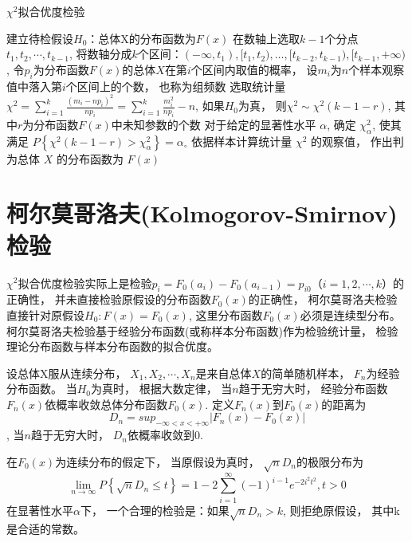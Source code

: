 \begin{algorithm}
\caption{$\chi^2$拟合优度检验}
建立待检假设$H_0$：总体X的分布函数为$F(x)$\;
在数轴上选取$k-1$个分点$t_1,t_2,\cdots,t_{k-1}$, 将数轴分成$k$个区间：$(-\infty,t_1), [t_1,t_2), …, [t_{k-2},t_{k-1}), [t_{k-1},+\infty)$, 令$p_i$为分布函数$F(x)$的总体$X$在第$i$个区间内取值的概率， 设$m_i$为$n$个样本观察值中落入第$i$个区间上的个数， 也称为组频数\;
选取统计量$\chi^2=\sum_{i=1}^{k}\frac{(m_i-np_i)^2}{np_i}=\sum_{i=1}^{k}{\frac{m_i^2}{np_i}-n}$, 如果$H_0$为真， 则$\chi^2 \sim \chi^2(k-1-r)$, 其中$r$为分布函数$F(x)$中未知参数的个数\;
对于给定的显著性水平 $  \alpha  $, 确定 $  \chi_{\alpha}^{2}  $, 使其满足 $  P\left\{\chi^{2}(k-1-r)>\chi_{\alpha}^{2}\right\}=\alpha_{\circ}  $ \;
依据样本计算统计量 $  \chi^{2}  $ 的观察值， 作出判
为总体 $  X  $ 的分布函数为 $  F(x)  $ \;
\end{algorithm}

\section{柯尔莫哥洛夫(Kolmogorov-Smirnov)检验}

$\chi^2$拟合优度检验实际上是检验$p_i=F_0(a_i)-F_0(a_{i-1})=p_{i0}（i=1,2,\cdots,k）$的正确性， 并未直接检验原假设的分布函数$F_0(x)$的正确性， 柯尔莫哥洛夫检验直接针对原假设$H_0:F(x)=F_0(x)$, 这里分布函数$F_0(x)$必须是连续型分布。 柯尔莫哥洛夫检验基于经验分布函数(或称样本分布函数)作为检验统计量， 检验理论分布函数与样本分布函数的拟合优度。 

设总体X服从连续分布， $X_1,X_2,\cdots,X_n$是来自总体$X$的简单随机样本， $F_n$为经验分布函数。 当$H_0$为真时， 根据大数定律， 当$n$趋于无穷大时， 经验分布函数$F_n(x)$依概率收敛总体分布函数$F_0(x)$. 定义$F_n(x)$到$F_0(x)$的距离为
\begin{equation}D_n={sup}_{-\infty<x<+\infty}\left|F_n(x)-F_0(x)\right|\end{equation}, 
当$n$趋于无穷大时， $D_n$依概率收敛到$0$. 

\begin{theorem}[Kolmogorov定理]  
    在$F_0(x)$为连续分布的假定下， 当原假设为真时， $\sqrt n D_n$的极限分布为
\begin{equation} \lim _{n \rightarrow \infty} P\left\{\sqrt{n} D_{n} \leq t\right\}=1-2 \sum_{i=1}^{\infty}(-1)^{i-1} e^{-2 i^{2} t^{2}}, t>0 \end{equation}  
在显著性水平$\alpha$下， 一个合理的检验是：如果$\sqrt n D_n>k$, 则拒绝原假设， 其中k是合适的常数。    
\end{theorem}


